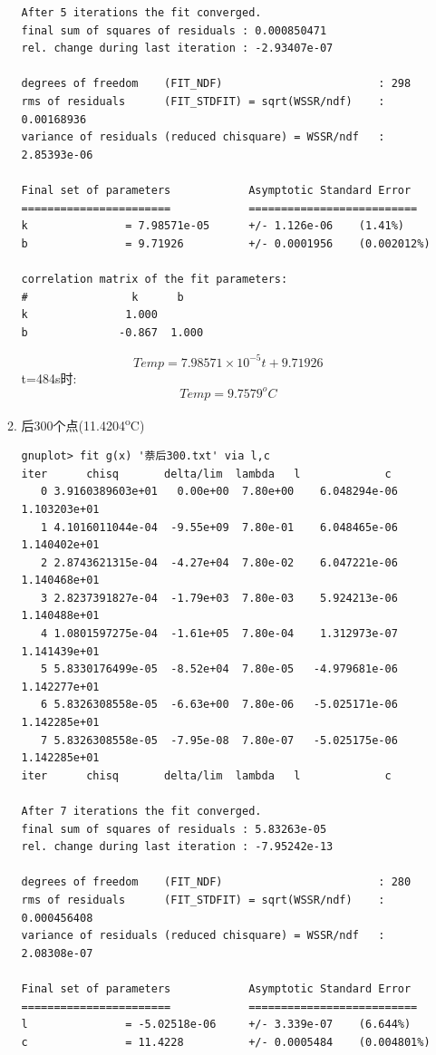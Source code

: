 \documentclass[11pt]{report}
\begin{document}
\begin{enumerate}
\begin{enumerate}
\begin{verbatim}
After 5 iterations the fit converged.
final sum of squares of residuals : 0.000850471
rel. change during last iteration : -2.93407e-07

degrees of freedom    (FIT_NDF)                        : 298
rms of residuals      (FIT_STDFIT) = sqrt(WSSR/ndf)    : 0.00168936
variance of residuals (reduced chisquare) = WSSR/ndf   : 2.85393e-06

Final set of parameters            Asymptotic Standard Error
=======================            ==========================
k               = 7.98571e-05      +/- 1.126e-06    (1.41%)
b               = 9.71926          +/- 0.0001956    (0.002012%)

correlation matrix of the fit parameters:
#                k      b      
k               1.000 
b              -0.867  1.000 

\end{verbatim}
\[
Temp=7.98571\times 10^{-5}t+9.71926
\]
t=484s时:
\[
Temp=9.7579^{o}C
\]


\item 后300个点(11.4204\textsuperscript{o}C)
\label{sec:orgffce876}
\begin{verbatim}
gnuplot> fit g(x) '萘后300.txt' via l,c
iter      chisq       delta/lim  lambda   l             c            
   0 3.9160389603e+01   0.00e+00  7.80e+00    6.048294e-06   1.103203e+01
   1 4.1016011044e-04  -9.55e+09  7.80e-01    6.048465e-06   1.140402e+01
   2 2.8743621315e-04  -4.27e+04  7.80e-02    6.047221e-06   1.140468e+01
   3 2.8237391827e-04  -1.79e+03  7.80e-03    5.924213e-06   1.140488e+01
   4 1.0801597275e-04  -1.61e+05  7.80e-04    1.312973e-07   1.141439e+01
   5 5.8330176499e-05  -8.52e+04  7.80e-05   -4.979681e-06   1.142277e+01
   6 5.8326308558e-05  -6.63e+00  7.80e-06   -5.025171e-06   1.142285e+01
   7 5.8326308558e-05  -7.95e-08  7.80e-07   -5.025175e-06   1.142285e+01
iter      chisq       delta/lim  lambda   l             c            

After 7 iterations the fit converged.
final sum of squares of residuals : 5.83263e-05
rel. change during last iteration : -7.95242e-13

degrees of freedom    (FIT_NDF)                        : 280
rms of residuals      (FIT_STDFIT) = sqrt(WSSR/ndf)    : 0.000456408
variance of residuals (reduced chisquare) = WSSR/ndf   : 2.08308e-07

Final set of parameters            Asymptotic Standard Error
=======================            ==========================
l               = -5.02518e-06     +/- 3.339e-07    (6.644%)
c               = 11.4228          +/- 0.0005484    (0.004801%)


\end{verbatim}
\end{enumerate}
\end{enumerate}
\end{document}
